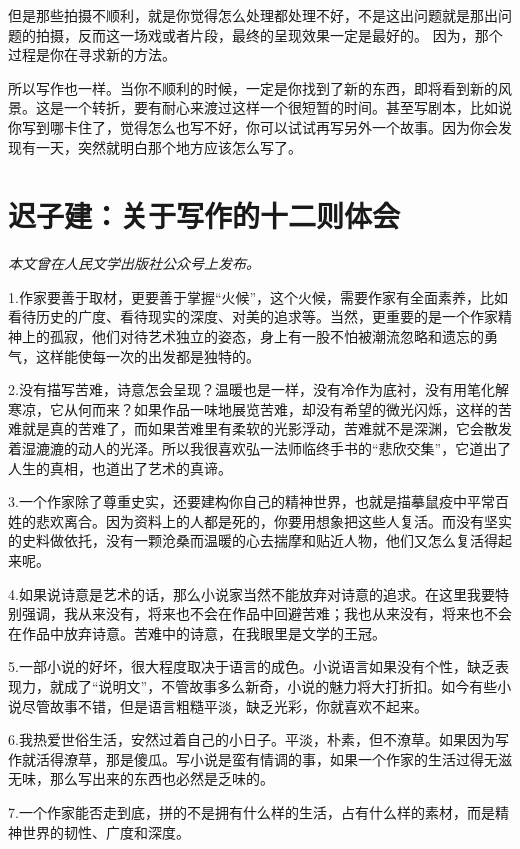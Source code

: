 \documentclass[fontset=fandol,12pt,a5paper]{ctexbook}
\begin{document}
‍‍但是那些拍摄不顺利，就是你觉得怎么处理都处理不好，不是这出问题就是那出问题的拍摄，‍‍反而这一场戏或者片段，最终的呈现效果一定是最好的。
因为，那个过程是你在寻求新的方法。

‍‍所以写作也一样。当你不顺利的时候，一定是你找到了新的东西，即将看到新的风景。这是‍‍一个转折，要有耐心来渡过这样一个很短暂的时间‍。甚至写剧本，‍‍比如说你写到哪卡住了，觉得怎么也写不好，你可以试试再写另外一个故事。因为你会发现有一天，突然就明白那个地方应该怎么写了。


\newpage

\section{迟子建：关于写作的十二则体会}

\emph{本文曾在人民文学出版社公众号上发布。}
\vspace{2em}

1.作家要善于取材，更要善于掌握“火候”，这个火候，需要作家有全面素养，比如看待历史的广度、看待现实的深度、对美的追求等。当然，更重要的是一个作家精神上的孤寂，他们对待艺术独立的姿态，身上有一股不怕被潮流忽略和遗忘的勇气，这样能使每一次的出发都是独特的。

2.没有描写苦难，诗意怎会呈现？温暖也是一样，没有冷作为底衬，没有用笔化解寒凉，它从何而来？如果作品一味地展览苦难，却没有希望的微光闪烁，这样的苦难就是真的苦难了，而如果苦难里有柔软的光影浮动，苦难就不是深渊，它会散发着湿漉漉的动人的光泽。所以我很喜欢弘一法师临终手书的“悲欣交集”，它道出了人生的真相，也道出了艺术的真谛。

3.一个作家除了尊重史实，还要建构你自己的精神世界，也就是描摹鼠疫中平常百姓的悲欢离合。因为资料上的人都是死的，你要用想象把这些人复活。而没有坚实的史料做依托，没有一颗沧桑而温暖的心去揣摩和贴近人物，他们又怎么复活得起来呢。

4.如果说诗意是艺术的话，那么小说家当然不能放弃对诗意的追求。在这里我要特别强调，我从来没有，将来也不会在作品中回避苦难；我也从来没有，将来也不会在作品中放弃诗意。苦难中的诗意，在我眼里是文学的王冠。

5.一部小说的好坏，很大程度取决于语言的成色。小说语言如果没有个性，缺乏表现力，就成了“说明文”，不管故事多么新奇，小说的魅力将大打折扣。如今有些小说尽管故事不错，但是语言粗糙平淡，缺乏光彩，你就喜欢不起来。

6.我热爱世俗生活，安然过着自己的小日子。平淡，朴素，但不潦草。如果因为写作就活得潦草，那是傻瓜。写小说是蛮有情调的事，如果一个作家的生活过得无滋无味，那么写出来的东西也必然是乏味的。

7.一个作家能否走到底，拼的不是拥有什么样的生活，占有什么样的素材，而是精神世界的韧性、广度和深度。
\end{document}
